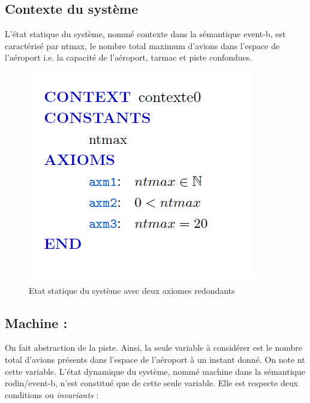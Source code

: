 \subsection{Contexte du système}
L'état statique du système, nommé contexte dans la sémantique event-b, est caractérisé par ntmax, le nombre total maximum d'avions dans  l'espace de l'aéroport i.e. la capacité de l'aéroport, tarmac et piste confondues.
\begin{figure}[H]
	\begin{center}	
		\includegraphics[scale=0.8]{images/0/ctx0}
		\caption{Etat statique du système avec deux axiomes redondants}
		\label{ctx0}
	\end{center}
\end{figure}

\subsection{Machine :}

On fait abstraction de la piste. Ainsi, la seule variable à considérer est le nombre total d'avions présents dans l'espace de l'aéroport à un instant donné. On note nt cette variable. L'état dynamique du système, nommé machine dans la sémantique rodin/event-b, n'est constitué que de cette seule variable. Elle est respecte deux conditions ou \textit{invariants} :

